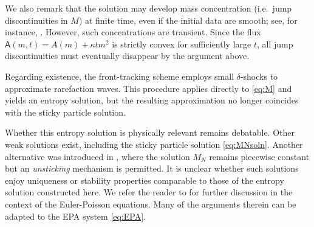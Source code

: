 \documentclass[11pt,reqno]{amsart}
\theoremstyle{definition}
\theoremstyle{remark}
\def\A{\mathsf{A}}
\begin{document}
	We also remark that the solution may develop mass concentration (i.e.\ jump discontinuities in $M$) at finite time, even if the initial data are smooth; see, for instance, \cite{bhatnagar2023critical}. However, such concentrations are transient. Since the flux $\A(m,t)=A(m)+\kappa t m^2$ is strictly convex for sufficiently large $t$, all jump discontinuities must eventually disappear by the argument above.
	
	Regarding existence, the front-tracking scheme employs small $\delta$-shocks to approximate rarefaction waves. This procedure applies directly to \eqref{eq:M} and yields an entropy solution, but the resulting approximation no longer coincides with the sticky particle solution.
	
	Whether this entropy solution is physically relevant remains debatable. Other weak solutions exist, including the sticky particle solution \eqref{eq:MNsoln}. Another alternative was introduced in \cite{carrillo2023equivalence}, where the solution $M_N$ remains piecewise constant but an \emph{unsticking} mechanism is permitted. It is unclear whether such solutions enjoy uniqueness or stability properties comparable to those of the entropy solution constructed here. We refer the reader to \cite{carrillo2023equivalence} for further discussion in the context of the Euler-Poisson equations. Many of the arguments therein can be adapted to the EPA system \eqref{eq:EPA}.
	
	
	
	
	
\end{document}
